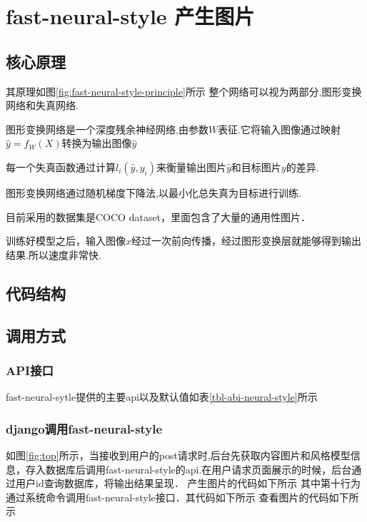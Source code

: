 \section{fast-neural-style 产生图片}
\subsection{核心原理}
其原理如图\ref{fig:fast-neural-style-principle}所示
整个网络可以视为两部分,图形变换网络和失真网络.

图形变换网络是一个深度残余神经网络,由参数$W$表征.它将输入图像通过映射$\hat y=f_W(X)$转换为输出图像$\hat y$

每一个失真函数通过计算$l_i(\hat y,y_i)$来衡量输出图片$\hat y$和目标图片$y$的差异.

图形变换网络通过随机梯度下降法,以最小化总失真为目标进行训练.

目前采用的数据集是COCO dataset，里面包含了大量的通用性图片．

训练好模型之后，输入图像$x$经过一次前向传播，经过图形变换层就能够得到输出结果.所以速度非常快.
\subsection{代码结构}

\subsection{调用方式}

\subsubsection{API接口}
fast-neural-sytle提供的主要api以及默认值如表\ref{tbl-abi-neural-style}所示
\subsubsection{django调用fast-neural-style}
如图\ref{fig:top}所示，当接收到用户的post请求时,后台先获取内容图片和风格模型信息，存入数据库后调用fast-neural-style的api.在用户请求页面展示的时候，后台通过用户id查询数据库，将输出结果呈现．
产生图片的代码如下所示
其中第十行为通过系统命令调用fast-neural-style接口．其代码如下所示
查看图片的代码如下所示


